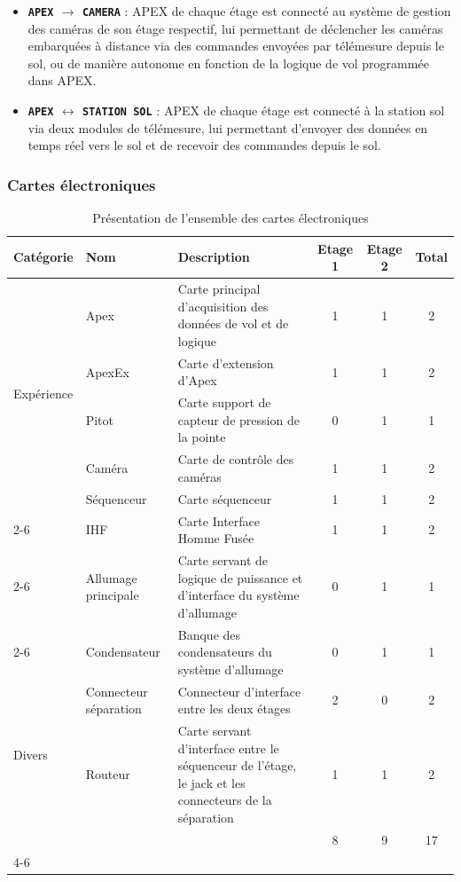 \begin{itemize}
    de la mission.
    \item \textbf{\texttt{APEX} $\longrightarrow$ \texttt{CAMERA}} : APEX de chaque étage est connecté au système de gestion des
    caméras de son étage respectif, lui permettant de déclencher les caméras embarquées à distance via des commandes envoyées par
    télémesure depuis le sol, ou de manière autonome en fonction de la logique de vol programmée dans APEX.
    \item \textbf{\texttt{APEX} $\longleftrightarrow$ \texttt{STATION SOL}} : APEX de chaque étage est connecté à la station sol
    via deux modules de télémesure, lui permettant d'envoyer des données en temps réel vers le sol et de recevoir des commandes
    depuis le sol.
\end{itemize}

\subsubsection{Cartes électroniques}

\vspace{-0.3cm}

\begin{table}[H]
    \centering
    \begin{tabular}{|l|p{2cm}|p{6cm}|c|c|c|}
    \hline
    Catégorie & Nom & Description & Etage 1 & Etage 2 & Total \\ \hline
    \multirow{5}{*}{Expérience} & Apex & Carte principal d'acquisition des données de vol et de logique & 1 & 1 & 2 \\ \cline{2-6}
                                & ApexEx & Carte d'extension d'Apex & 1 & 1 & 2 \\ \cline{2-6}
                                & Pitot & Carte support de capteur de pression de la pointe & 0 & 1 & 1 \\ \cline{2-6}
                                & Caméra & Carte de contrôle des caméras & 1 & 1 & 2 \\
    \hline
    \multirow{3}{*}{Séquenceur} & Séquenceur & Carte séquenceur & 1 & 1 & 2 \\ \cline{2-6}
                                & \acrshort{IHF} & Carte Interface Homme Fusée & 1 & 1 & 2 \\ \cline{2-6}
                                & Allumage principale & Carte servant de logique de puissance et d'interface du système d'allumage & 0 & 1 & 1 \\ \cline{2-6}
                                & Condensateur & Banque des condensateurs du système d'allumage & 0 & 1 & 1 \\
    \hline
    \multirow{2}{*}{Divers} & Connecteur séparation & Connecteur d'interface entre les deux étages & 2 & 0 & 2 \\ \cline{2-6}
                            & Routeur & Carte servant d'interface entre le séquenceur de l'étage, le jack et les connecteurs de la séparation & 1 & 1 & 2 \\
    \hline
    \multicolumn{3}{c|}{} & 8 & 9 & 17 \\
    \cline{4-6}
    \end{tabular}
    \caption{Présentation de l'ensemble des cartes électroniques}
\end{table}

